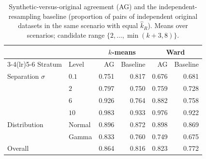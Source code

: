 \documentclass[pdflatex,sn-basic]{sn-jnl}
\begin{document}
\begin{table}[h]
\centering
\caption{Synthetic-versus-original agreement (AG) and the
  independent-resampling baseline (proportion of pairs of independent original
  datasets in the same scenario with equal $\hat{k}_R$). Means over scenarios;
  candidate range $\{2,\dots,\min(k+3,8)\}$.}
\label{tabS:baseline}
\small
\begin{tabular}{llrrrr}
\toprule
 & & \multicolumn{2}{c}{$k$-means} & \multicolumn{2}{c}{Ward} \\
\cmidrule(lr){3-4}\cmidrule(lr){5-6}
Stratum & Level & AG & Baseline & AG & Baseline \\
\midrule
Separation $\sigma$ & $0.1$ & 0.751 & 0.817 & 0.676 & 0.681 \\
 & $2$ & 0.797 & 0.750 & 0.759 & 0.728 \\
 & $6$ & 0.926 & 0.764 & 0.882 & 0.758 \\
 & $10$ & 0.983 & 0.933 & 0.976 & 0.922 \\
\addlinespace
Distribution & Normal & 0.896 & 0.872 & 0.898 & 0.869 \\
 & Gamma & 0.833 & 0.760 & 0.749 & 0.675 \\
\midrule
Overall & & 0.864 & 0.816 & 0.823 & 0.772 \\
\bottomrule
\end{tabular}
\end{table}
\end{document}
